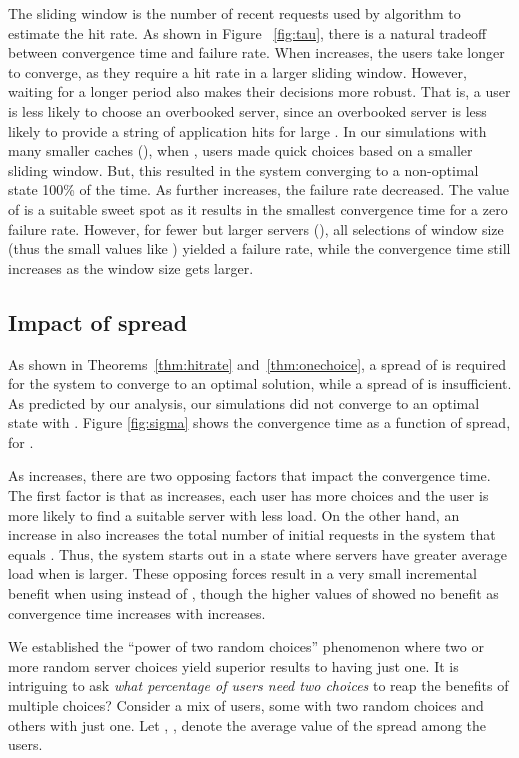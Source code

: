 \documentclass[conference]{IEEEtran}
\begin{document}
The sliding window  is the number of recent requests used by algorithm  to estimate the hit rate. As shown in Figure ~\ref{fig:tau}, there is a natural tradeoff between convergence time and failure rate. When  increases, the users take longer to converge, as they require a  hit rate in a larger sliding window. However, waiting for a longer period also makes their decisions more robust. That is, a user is  less likely to choose an overbooked server, since an overbooked server is less likely to provide a string of  application hits for large . In our simulations with many smaller caches (), when , users made quick choices based on a smaller sliding window. But, this resulted in the system converging to a non-optimal state 100\% of the time. As  further increases, the failure rate decreased. The value of  is a suitable sweet spot as it  results in the  smallest  convergence time for a zero failure rate. However, for fewer but larger servers (), all selections of window size  (thus the small values like ) yielded a  failure rate, while the convergence time still increases as the window size gets larger.






\subsection{Impact of spread }
As shown in Theorems~\ref{thm:hitrate} and~\ref{thm:onechoice}, a spread of   is required for the system to converge to an optimal solution, while a spread of  is insufficient. As predicted by our analysis, our simulations did not converge to an optimal state with . Figure \ref{fig:sigma} shows the  convergence time as a function of spread, for  . 



As   increases, there are two opposing factors that impact the convergence time. The first factor is that  as  increases, each user has more choices and the user is more likely to find a suitable server with less load. On the other hand, an increase in  also increases the total number of initial requests in the system that equals . Thus, the system starts out in a state where servers have greater average load when  is larger. These opposing forces result in a very small incremental benefit when using  instead of , though the higher values of  showed no benefit as convergence time increases with  increases.

We established the ``power of two random choices'' phenomenon where two or more random server choices yield superior results to having just one. It is intriguing to ask {\em what percentage of users need two choices} to reap the benefits of multiple choices? Consider a mix of users, some with two random choices and others with just one. Let  , , denote the average value of the spread among the users.
\end{document}
